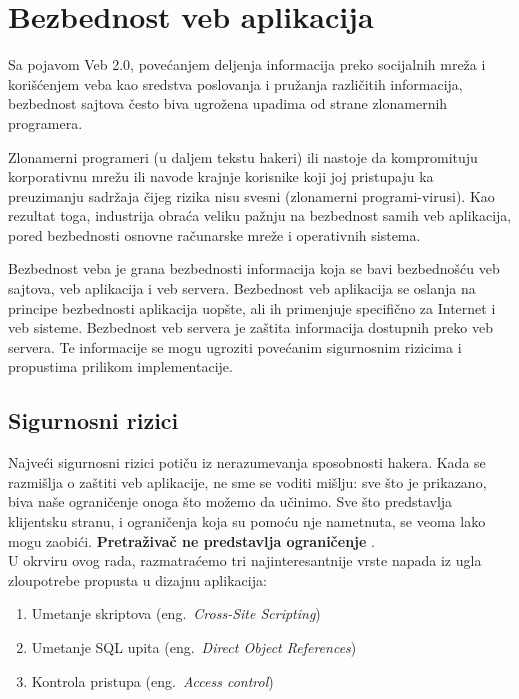 \documentclass[a4paper]{article}
\begin{document}
\section{Bezbednost veb aplikacija} \label{aplikacije}

Sa pojavom Veb 2.0, povećanjem deljenja informacija preko socijalnih mreža i korišćenjem veba kao sredstva poslovanja i pružanja različitih informacija, bezbednost sajtova često biva ugrožena upadima od strane zlonamernih programera.

Zlonamerni programeri (u daljem tekstu hakeri) ili nastoje da kompromituju korporativnu mrežu ili navode krajnje korisnike koji joj pristupaju ka preuzimanju sadržaja čijeg rizika nisu svesni (zlonamerni programi-virusi). Kao rezultat toga, industrija obraća veliku pažnju na bezbednost samih veb aplikacija, pored bezbednosti osnovne računarske mreže i operativnih sistema.

Bezbednost veba je grana bezbednosti informacija koja se bavi bezbednošću veb sajtova, veb aplikacija i veb servera. Bezbednost veb aplikacija se oslanja na principe bezbednosti aplikacija uopšte, ali ih primenjuje specifično za Internet i veb sisteme.
Bezbednost veb servera je zaštita informacija dostupnih preko veb servera. Te informacije se mogu ugroziti povećanim sigurnosnim rizicima i propustima prilikom implementacije.

\subsection{Sigurnosni rizici}

Najveći sigurnosni rizici potiču iz nerazumevanja sposobnosti hakera. Kada se razmišlja o zaštiti veb aplikacije, ne sme se voditi mišlju: sve što je prikazano, biva naše ograničenje onoga što možemo da učinimo. Sve što predstavlja klijentsku stranu, i ograničenja koja su pomoću nje nametnuta, se veoma lako mogu zaobići.
\textbf{Pretraživač ne predstavlja ograničenje }.\\
U okrviru ovog rada, razmatraćemo tri najinteresantnije vrste napada iz ugla zloupotrebe propusta u dizajnu aplikacija:
\begin{enumerate}
	\item Umetanje skriptova (eng.~{\em Cross-Site Scripting})
	\item Umetanje SQL upita (eng.~{\em Direct Object References})
	\item Kontrola pristupa (eng.~{\em Access control})
\end{enumerate}
\end{document}
